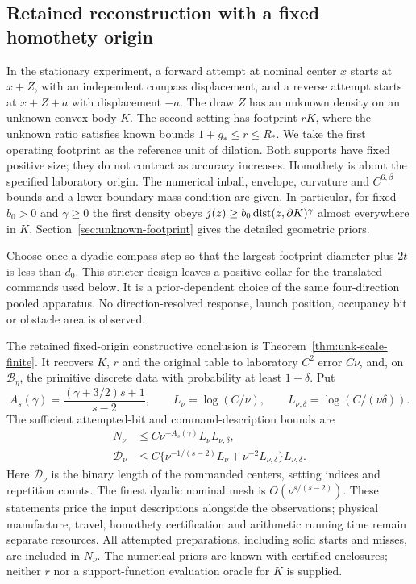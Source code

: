 \subsection{Retained reconstruction with a fixed homothety origin}
In the stationary experiment, a forward attempt at nominal center $x$
starts at $x+Z$, with an independent compass displacement, and a reverse
attempt starts at $x+Z+a$ with displacement $-a$. The draw $Z$ has an
unknown density on an unknown convex body $K$. The second setting has
footprint $rK$, where the unknown ratio satisfies known bounds
$1+g_*\le r\le R_*$. We take the first operating footprint as the
reference unit of dilation. Both supports have fixed positive size;
they do not contract as accuracy increases. Homothety is about the
specified laboratory origin. The numerical inball, envelope, curvature
and $C^{6,\beta}$ bounds and a lower boundary-mass condition are given.
In particular, for fixed $b_0>0$ and $\gamma\ge0$ the first density obeys
$j(z)\ge b_0\operatorname{dist}(z,\partial K)^\gamma$ almost everywhere in $K$.
Section~\ref{sec:unknown-footprint} gives the detailed geometric priors.

Choose once a dyadic compass step so that the largest footprint
diameter plus $2t$ is less than $d_0$. This stricter design leaves a
positive collar for the translated commands used below. It is a
prior-dependent choice of the same four-direction pooled apparatus.
No direction-resolved response, launch position, occupancy bit or
obstacle area is observed.

The retained fixed-origin constructive conclusion is
Theorem~\ref{thm:unk-scale-finite}. It recovers $K$, $r$ and the original
table to laboratory $C^2$ error $C\nu$, and, on $\mathcal B_\eta$, the
primitive discrete data with probability at least $1-\delta$. Put
\begin{equation}\label{eq:new-upper-exponent}
 A_s(\gamma)=\frac{(\gamma+3/2)s+1}{s-2},\qquad
 L_\nu=\log(C/\nu),\qquad L_{\nu,\delta}=\log(C/(\nu\delta)).
\end{equation}
The sufficient attempted-bit and command-description bounds are
\begin{align}
 N_\nu&\le C\nu^{-A_s(\gamma)}L_\nu L_{\nu,\delta},
                                              \label{eq:main-new-attempts}\\
 \mathcal D_\nu&\le C\bigl\{\nu^{-1/(s-2)}L_\nu
                      +\nu^{-2}L_{\nu,\delta}\bigr\}L_{\nu,\delta}.
                                              \label{eq:main-new-control}
\end{align}
Here $\mathcal D_\nu$ is the binary length of the commanded centers,
setting indices and repetition counts. The finest dyadic nominal mesh
is $O(\nu^{s/(s-2)})$. These statements price the input descriptions
alongside the observations; physical manufacture, travel, homothety
certification and arithmetic running time remain separate resources.
All attempted preparations, including solid starts and misses, are
included in $N_\nu$. The numerical priors are known with certified
enclosures; neither $r$ nor a support-function evaluation oracle for
$K$ is supplied.


